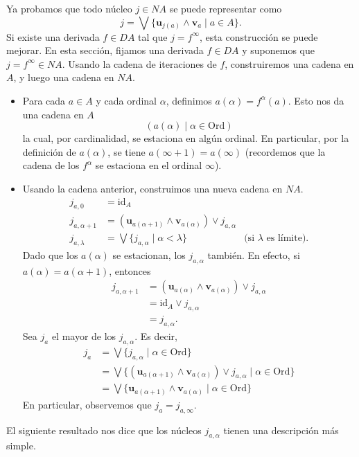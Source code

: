 \documentclass[12pt,letterpaper,titlepage]{article}
\theoremstyle{definition}
\renewcommand\sup{\vee}
\newcommand\Sup{\bigvee}
\renewcommand\inf{\wedge}
\newcommand\unuc[1]{\mathbf u_{#1}}
\newcommand\vnuc[1]{\mathbf v_{#1}}
\newcommand\<{\langle}
\renewcommand\>{\rangle}
\newcommand{\Ord}{\mathrm{Ord}}
\newcommand{\id}{\mathrm{id}}
\begin{document}
Ya probamos que todo núcleo $j\in NA$ se puede representar como
\[
    j = \Sup\{\unuc{j(a)}\inf \vnuc a \mid a\in A \}
.\]
Si existe una derivada $f\in DA$ tal que $j=f^\infty$,
esta construcción se puede mejorar.
En esta sección, fijamos una derivada $f\in DA$ y suponemos que
$j=f^\infty\in NA$.
Usando la cadena de iteraciones de $f$, construiremos una cadena
en $A$, y luego una cadena en $NA$.
\begin{itemize}
  \item
  Para cada $a\in A$ y cada ordinal $\alpha$, definimos
  $a(\alpha)=f^\alpha(a)$.
  Esto nos da una cadena en $A$
  \[
    (a(\alpha) \mid \alpha\in\Ord)
  \]
  la cual, por cardinalidad, se estaciona en algún ordinal.
  En particular, por la definición de $a(\alpha)$, se tiene
  $a(\infty+1)=a(\infty)$ (recordemos que la cadena de los
  $f^\alpha$ se estaciona en el ordinal $\infty$).
  \item
  Usando la cadena anterior, construimos una nueva cadena en $NA$.
  \begin{align*}
    j_{a,0}
    &= \id_A \\
    j_{a,\alpha+1}
    &= (\unuc {a(\alpha+1)}\inf \vnuc {a(\alpha)})\sup j_{a,\alpha}
    \\
    j_{a,\lambda}
    &= \Sup\{j_{a,\alpha} \mid \alpha < \lambda\}
      & \text{(si $\lambda$ es límite).}
  \end{align*}
  Dado que los $a(\alpha)$ se estacionan, los $j_{a,\alpha}$ también.
  En efecto, si $a(\alpha) = a(\alpha+1)$, entonces
  \begin{align*}
    j_{a,\alpha+1}
    &= (\unuc {a(\alpha)}\inf \vnuc {a(\alpha)})
      \sup j_{a,\alpha} \\
    &= \id_A\sup j_{a,\alpha} \\
    &= j_{a,\alpha}.
  \end{align*}
  Sea $j_a$ el mayor de los $j_{a,\alpha}$.
  Es decir,
  \begin{align*}
    j_a
    &= \Sup\{j_{a,\alpha} \mid \alpha\in\Ord\} \\
    &= \Sup\{(\unuc {a(\alpha+1)}\inf\vnuc {a(\alpha)})
      \sup j_{a,\alpha} \mid \alpha\in\Ord\} \\
    &= \Sup\{\unuc {a(\alpha+1)}\inf\vnuc {a(\alpha)}
    \mid \alpha\in\Ord\}
  \end{align*}
  En particular, observemos que $j_a=j_{a,\infty}$.
\end{itemize}
El siguiente resultado nos dice que los núcleos
$j_{a,\alpha}$ tienen una descripción más simple.
\end{document}
